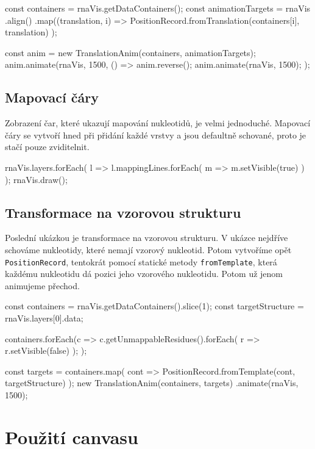 \begin{code}
const containers = rnaVis.getDataContainers();
const animationTargets = rnaVis
  .align()
  .map((translation, i) 
    => PositionRecord.fromTranslation(containers[i], translation)
  );

const anim = new TranslationAnim(containers, animationTargets);
anim.animate(rnaVis, 1500, () => {
  anim.reverse();
  anim.animate(rnaVis, 1500);
});
\end{code}

\subsection{Mapovací čáry}

Zobrazení čar, které ukazují mapování nukleotidů, je velmi jednoduché.
Mapovací čáry se vytvoří hned při přidání každé vrstvy a jsou defaultně
schované, proto je stačí pouze zviditelnit.

\begin{code}
rnaVis.layers.forEach(
  l => l.mappingLines.forEach(
    m => m.setVisible(true)
  )
);
rnaVis.draw();
\end{code}

\subsection{Transformace na vzorovou strukturu}

Poslední ukázkou je transformace na vzorovou strukturu. V ukázce nejdříve
schováme nukleotidy, které nemají vzorový nukleotid. Potom vytvoříme opět
\texttt{PositionRecord}, tentokrát pomocí statické metody
\texttt{fromTemplate}, která každému nukleotidu dá pozici jeho vzorového
nukleotidu. Potom už jenom animujeme přechod.

\begin{code}
const containers = rnaVis.getDataContainers().slice(1);
const targetStructure = rnaVis.layers[0].data;

containers.forEach(c => {
  c.getUnmappableResidues().forEach(
    r => r.setVisible(false)
  );
});

const targets = containers.map(
  cont => PositionRecord.fromTemplate(cont, targetStructure)
);
new TranslationAnim(containers, targets)
  .animate(rnaVis, 1500);
\end{code}

\section{Použití canvasu}

